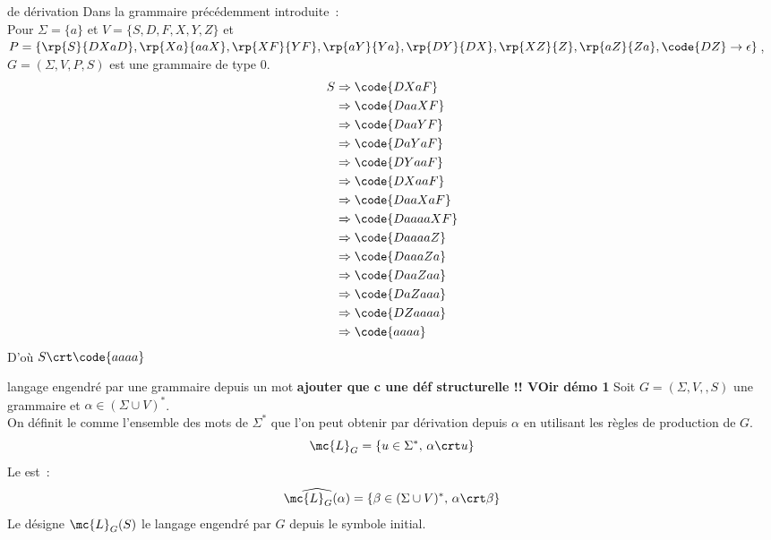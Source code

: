 \begin{adjustwidth}{-3cm}{-3cm}
\begin{exemple}{}{de dérivation}
    Dans la grammaire précédemment introduite~:\\
    Pour $\Sigma = \{a\}$ et $V = \{S,D,F,X,Y,Z\}$
    et $P = \{\rp{S}{DXaD},\rp{Xa}{aaX},\rp{XF}{YF},\rp{aY}{Ya},\rp{DY}{DX},\rp{XZ}{Z},\rp{aZ}{Za},\code{DZ}\to \epsilon\}$, $G = (\Sigma, V, P, S)$ est une grammaire de type 0.
    \begin{align*}
        S &\Rightarrow \code{DXaF} \\
        &\Rightarrow \code{DaaXF}\\
        &\Rightarrow \code{DaaYF}\\
        &\Rightarrow \code{DaYaF}\\
        &\Rightarrow \code{DYaaF}\\
        &\Rightarrow \code{DXaaF}\\
        &\Rightarrow \code{DaaXaF}\\
        &\Rightarrow \code{DaaaaXF}\\
        &\Rightarrow \code{DaaaaZ}\\
        &\Rightarrow \code{DaaaZa}\\
        &\Rightarrow \code{DaaZaa}\\
        &\Rightarrow \code{DaZaaa}\\
        &\Rightarrow \code{DZaaaa}\\
        &\Rightarrow \code{aaaa}
    \end{align*}
    D'où $S \crt \code{aaaa}$
\end{exemple}

\begin{definition}{}{langage engendré par une grammaire depuis un mot}
    \textbf{ajouter que c une déf structurelle !! VOir démo 1}
    Soit $G = (\Sigma, V, , S)$ une grammaire et $\alpha \in (\Sigma\cup V)^*$.\\
    On définit le  comme l'ensemble des mots de $\Sigma^*$ que l'on peut obtenir par dérivation depuis $\alpha$ en utilisant les règles de production de $G$.\\
    $$\mc{L}_G = \{u \in \Sigma^*,\, \alpha \crt u\}$$
    Le  est~:
    $$\widehat{\mc{L}_G(\alpha)} = \{\beta \in (\Sigma \cup V)^*,\, \alpha \crt \beta\}$$
    Le  désigne $\mc{L}_G(S)$ le langage engendré par $G$ depuis le symbole initial.
\end{definition}


\end{adjustwidth}
